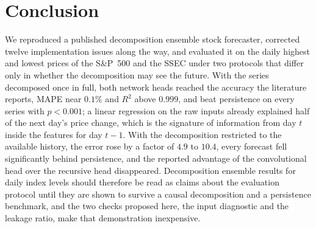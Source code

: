 \section{Conclusion}\label{sec:conclusion}
We reproduced a published decomposition ensemble stock forecaster, corrected
twelve implementation issues along the way, and evaluated it on the daily
highest and lowest prices of the S\&P~500 and the SSEC under two protocols that
differ only in whether the decomposition may see the future. With the series
decomposed once in full, both network heads reached the accuracy the
literature reports, MAPE near $0.1\%$ and $R^2$ above $0.999$, and beat
persistence on every series with $p<0.001$; a linear regression on the raw
inputs already explained half of the next day's price change, which is the
signature of information from day $t$ inside the features for day $t-1$. With
the decomposition restricted to the available history, the error rose by a
factor of $4.9$ to $10.4$, every forecast fell significantly behind
persistence, and the reported advantage of the convolutional head over the
recursive head disappeared. Decomposition ensemble results for daily index
levels should therefore be read as claims about the evaluation protocol until
they are shown to survive a causal decomposition and a persistence benchmark,
and the two checks proposed here, the input diagnostic and the leakage ratio,
make that demonstration inexpensive.
